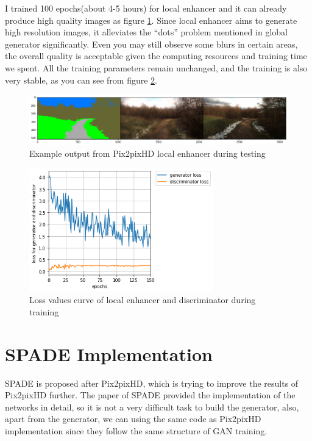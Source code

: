 I trained 100 epochs(about 4-5 hours) for local enhancer and it can already produce 
high quality images as figure \ref{fig:local-enhancer-output}. 
Since local enhancer aims to generate high resolution images, it alleviates the 
“dots” problem mentioned in global generator significantly.
Even you may still observe some blurs in certain areas, the overall quality is 
acceptable given the computing resources and training time we spent.
All the training parameters remain unchanged, and the training is also very stable, 
as you can see from figure \ref{fig:local-enhancer-loss}.
\begin{figure}[H]
    \begin{center}
    \includegraphics[width=14cm]{figures/local-enhancer-output}
    \end{center}
    \caption{Example output from Pix2pixHD local enhancer during testing}
    \label{fig:local-enhancer-output}
\end{figure}

\begin{figure}[H]
    \begin{center}
    \includegraphics[width=8cm]{figures/local-enhancer-loss}
    \end{center}
    \caption{Loss values curve of local enhancer and discriminator during training}
    \label{fig:local-enhancer-loss}
\end{figure}

\section{SPADE Implementation}
\nocite{SPADE-blog-1}
\nocite{SPADE-blog-2}
SPADE is proposed after Pix2pixHD, which is trying to improve the results of Pix2pixHD further. 
The paper of SPADE provided the implementation of the networks in detail, so it is not a very 
difficult task to build the generator, also, apart from the generator, we can using the same 
code as Pix2pixHD implementation since they follow the same structure of GAN training.
